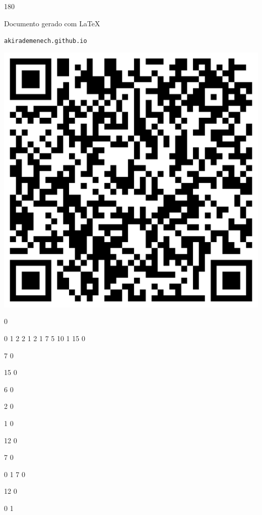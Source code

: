 \documentclass[12pt]{article}
\begin{document}
	\begin{turn}{180}	
		\begin{minipage}{\textwidth}		  
		  Documento gerado com \LaTeX			
		  
		  \texttt{akirademenech.github.io}

		  \includegraphics[height=0.3\textheight]{2e-2.pdf}

		\end{minipage}	
	\end{turn}  
		  
		\vfill  
		  
{
	0	%

	0	%
	1	%
	2	%
	2	%
	1	%
	2	%
	1	%
	7	%
	5	%
	10	%
	1	%
	15	%
	0	%

	7	%
	0	%

	15	%
	0	%

	6	%
	0	%

	2	%
	0	%

	1	%
	0	%

	12	%
	0	%

	7	%
	0	%

	0	%
	1	%
	7	%
	0	%

	12	%
	0	%

	0	%
	1	%
}	  
		    	
\end{document}
